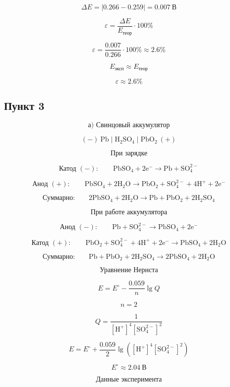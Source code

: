 \documentclass[a4paper, 12pt]{article}
\begin{document}
\[
    \Delta E =
    \left|0.266 - 0.259\right|
    =
    0.007\ \mathrm{В}
\]

\[
    \varepsilon =
    \frac{\Delta E}{E_{\text{теор}}}\cdot 100\%
\]

\[
    \varepsilon =
    \frac{0.007}{0.266}\cdot 100\%
    \approx
    2.6\%
\]

\[
    \boxed{
        E_{\text{эксп}} \approx E_{\text{теор}}
    }
\]

\[
    \boxed{
        \varepsilon \approx 2.6\%
    }
\]

\subsection*{Пункт 3}

\[
    \boxed{\text{а) Свинцовый аккумулятор}}
\]

\[
    \mathrm{(-)\ Pb \mid H_2SO_4 \mid PbO_2\ (+)}
\]

\[
    \boxed{\text{При зарядке}}
\]

\[
    \text{Катод }(-):\qquad
    \mathrm{PbSO_4 + 2e^- \rightarrow Pb + SO_4^{2-}}
\]

\[
    \text{Анод }(+):\qquad
    \mathrm{PbSO_4 + 2H_2O \rightarrow PbO_2 + SO_4^{2-} + 4H^+ + 2e^-}
\]

\[
    \text{Суммарно:}\qquad
    \mathrm{2PbSO_4 + 2H_2O \rightarrow Pb + PbO_2 + 2H_2SO_4}
\]

\[
    \boxed{\text{При работе аккумулятора}}
\]

\[
    \text{Анод }(-):\qquad
    \mathrm{Pb + SO_4^{2-} \rightarrow PbSO_4 + 2e^-}
\]

\[
    \text{Катод }(+):\qquad
    \mathrm{PbO_2 + SO_4^{2-} + 4H^+ + 2e^- \rightarrow PbSO_4 + 2H_2O}
\]

\[
    \text{Суммарно:}\qquad
    \mathrm{Pb + PbO_2 + 2H_2SO_4 \rightarrow 2PbSO_4 + 2H_2O}
\]

\[
    \boxed{\text{Уравнение Нернста}}
\]

\[
    E = E^\circ - \frac{0.059}{n}\lg Q
\]

\[
    n = 2
\]

\[
    Q =
    \frac{1}{[\mathrm{H^+}]^4[\mathrm{SO_4^{2-}}]^2}
\]

\[
    E =
    E^\circ
    +
    \frac{0.059}{2}
    \lg
    \left(
    [\mathrm{H^+}]^4[\mathrm{SO_4^{2-}}]^2
    \right)
\]

\[
    E^\circ \approx 2.04\ \mathrm{В}
\]

\[
    \boxed{\text{Данные эксперимента}}
\]
\end{document}

